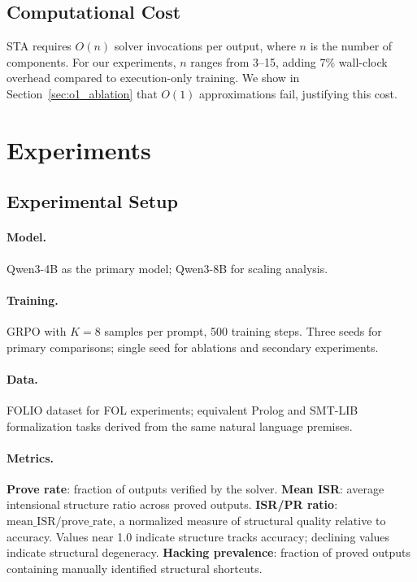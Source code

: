 \documentclass[11pt,a4paper]{article}
\begin{document}
\subsection{Computational Cost}

STA requires $O(n)$ solver invocations per output, where $n$ is the number of components. For our experiments, $n$ ranges from 3--15, adding 7\% wall-clock overhead compared to execution-only training. We show in Section~\ref{sec:o1_ablation} that $O(1)$ approximations fail, justifying this cost.

\section{Experiments}
\label{sec:experiments}

\subsection{Experimental Setup}

\paragraph{Model.} Qwen3-4B as the primary model; Qwen3-8B for scaling analysis.

\paragraph{Training.} GRPO with $K=8$ samples per prompt, 500 training steps. Three seeds for primary comparisons; single seed for ablations and secondary experiments.

\paragraph{Data.} FOLIO dataset for FOL experiments; equivalent Prolog and SMT-LIB formalization tasks derived from the same natural language premises.

\paragraph{Metrics.} \textbf{Prove rate}: fraction of outputs verified by the solver. \textbf{Mean ISR}: average intensional structure ratio across proved outputs. \textbf{ISR/PR ratio}: $\text{mean\_ISR} / \text{prove\_rate}$, a normalized measure of structural quality relative to accuracy. Values near 1.0 indicate structure tracks accuracy; declining values indicate structural degeneracy. \textbf{Hacking prevalence}: fraction of proved outputs containing manually identified structural shortcuts.
\end{document}
